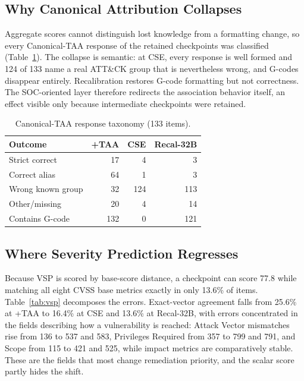 \documentclass[conference]{IEEEtran}
\begin{document}
\subsection{Why Canonical Attribution Collapses}
Aggregate scores cannot distinguish lost knowledge from a formatting change, so every Canonical-TAA response of the retained checkpoints was classified (Table~\ref{tab:taaerrors}). The collapse is semantic: at CSE, every response is well formed and 124 of 133 name a real ATT\&CK group that is nevertheless wrong, and G-codes disappear entirely. Recalibration restores G-code formatting but not correctness. The SOC-oriented layer therefore redirects the association behavior itself, an effect visible only because intermediate checkpoints were retained.

\begin{table}[t]
\caption{Canonical-TAA response taxonomy (133 items).}
\label{tab:taaerrors}
\centering
\scriptsize
\setlength{\tabcolsep}{2.7pt}
\begin{tabular}{@{}lrrr@{}}
\toprule
Outcome & +TAA & CSE & Recal-32B \\
\midrule
Strict correct & 17 & 4 & 3 \\
Correct alias & 64 & 1 & 3 \\
Wrong known group & 32 & 124 & 113 \\
Other/missing & 20 & 4 & 14 \\
Contains G-code & 132 & 0 & 121 \\
\bottomrule
\end{tabular}
\end{table}

\subsection{Where Severity Prediction Regresses}
Because VSP is scored by base-score distance, a checkpoint can score 77.8 while matching all eight CVSS base metrics exactly in only 13.6\% of items. Table~\ref{tab:vsp} decomposes the errors. Exact-vector agreement falls from 25.6\% at +TAA to 16.4\% at CSE and 13.6\% at Recal-32B, with errors concentrated in the fields describing how a vulnerability is reached: Attack Vector mismatches rise from 136 to 537 and 583, Privileges Required from 357 to 799 and 791, and Scope from 115 to 421 and 525, while impact metrics are comparatively stable. These are the fields that most change remediation priority, and the scalar score partly hides the shift.
\end{document}
